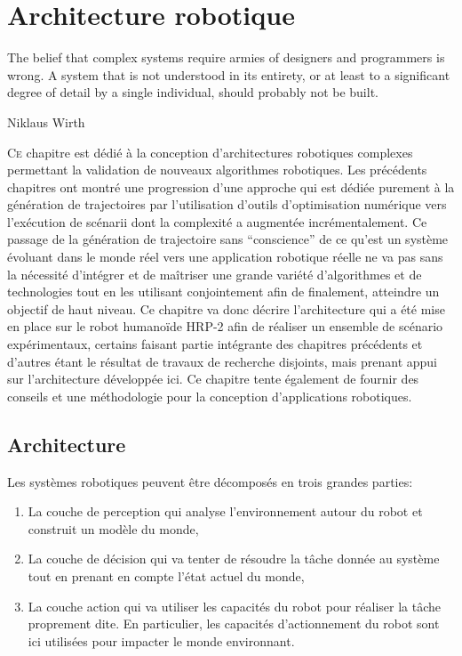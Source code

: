 \chapter{Architecture robotique}
\label{chap:integration}

\epigraph{\foreignlanguage{USenglish}{The belief that complex systems
    require armies of designers and programmers is wrong. A system
    that is not understood in its entirety, or at least to a
    significant degree of detail by a single individual, should
    probably not be built.}}{Niklaus Wirth}
\clearpage

\lettrine[lines=2, lraise=0.1, nindent=0em, slope=-.5em]%
{C}{e} chapitre est dédié à la conception d'architectures robotiques
complexes permettant la validation de nouveaux algorithmes robotiques.
Les précédents chapitres ont montré une progression d'une approche qui
est dédiée purement à la génération de trajectoires par l'utilisation
d'outils d'optimisation numérique vers l'exécution de scénarii
dont la complexité a augmentée incrémentalement. Ce passage de la
génération de trajectoire sans ``conscience'' de ce qu'est un système
évoluant dans le monde réel vers une application robotique réelle ne
va pas sans la nécessité d'intégrer et de maîtriser une grande variété
d'algorithmes et de technologies tout en les utilisant conjointement
afin de finalement, atteindre un objectif de haut niveau. Ce chapitre
va donc décrire l'architecture qui a été mise en place sur le robot
humanoïde HRP-2 afin de réaliser un ensemble de scénario
expérimentaux, certains faisant partie intégrante des chapitres
précédents et d'autres étant le résultat de travaux de recherche
disjoints, mais prenant appui sur l'architecture développée ici. Ce
chapitre tente également de fournir des conseils et une méthodologie
pour la conception d'applications robotiques.

\section{Architecture}


Les systèmes robotiques peuvent être décomposés en trois grandes
parties:

\begin{enumerate}
\item La couche de perception qui analyse
  l'environnement autour du robot et construit un modèle du monde,
\item La couche de décision qui va tenter de résoudre
  la tâche donnée au système tout en prenant en compte l'état actuel
  du monde,
\item La couche action qui va utiliser les capacités du robot pour
  réaliser la tâche proprement dite. En particulier, les capacités
  d'actionnement du robot sont ici utilisées pour impacter le monde
  environnant.
\end{enumerate}


